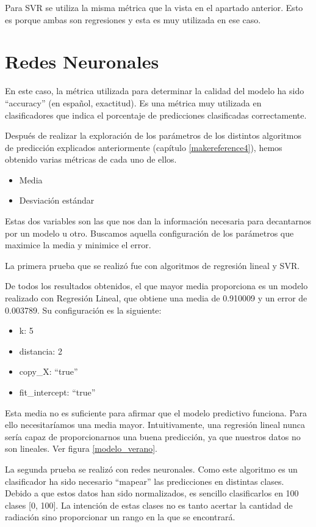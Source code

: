 Para SVR se utiliza la misma métrica que la vista en el apartado anterior. Esto es porque ambas son regresiones y esta es muy utilizada en ese caso.

\section{Redes Neuronales}
\label{makereference6.3}

En este caso, la métrica utilizada para determinar la calidad del modelo ha sido ``accuracy'' (en español, exactitud). Es una métrica muy utilizada en clasificadores que indica el porcentaje de predicciones clasificadas correctamente.

Después de realizar la exploración de los parámetros de los distintos algoritmos de predicción explicados anteriormente (capítulo \ref{makereference4}), hemos obtenido varias métricas de cada uno de ellos.

\begin{itemize}
	\item Media
	\item Desviación estándar
\end{itemize}

Estas dos variables son las que nos dan la información necesaria para decantarnos por un modelo u otro. Buscamos aquella configuración de los parámetros que maximice la media y minimice el error.

La primera prueba que se realizó fue con algoritmos de regresión lineal y SVR.

De todos los resultados obtenidos, el que mayor media proporciona es un modelo realizado con Regresión Lineal, que obtiene una media de 0.910009 y un error de 0.003789. Su configuración es la siguiente:

\begin{itemize}
	\item k: 5
	\item distancia: 2
	\item copy\_X: ``true''
	\item fit\_intercept: ``true''
\end{itemize}

Esta media no es suficiente para afirmar que el modelo predictivo funciona. Para ello necesitaríamos una media mayor. Intuitivamente, una regresión lineal nunca sería capaz de proporcionarnos una buena predicción, ya que nuestros datos no son lineales. Ver figura \ref{modelo_verano}.

La segunda prueba se realizó con redes neuronales. Como este algoritmo es un clasificador ha sido necesario ``mapear'' las predicciones en distintas clases. Debido a que estos datos han sido normalizados, es sencillo clasificarlos en 100 clases [0, 100]. La intención de estas clases no es tanto acertar la cantidad de radiación sino proporcionar un rango en la que se encontrará.

